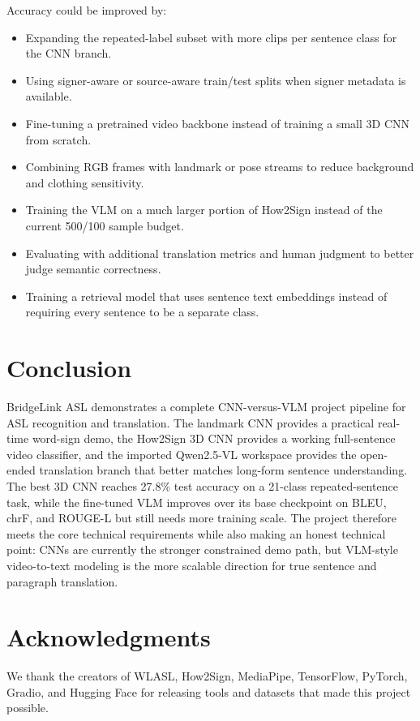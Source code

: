 \documentclass[10pt,twocolumn,letterpaper]{article}
\begin{document}
Accuracy could be improved by:
\begin{itemize}
    \item Expanding the repeated-label subset with more clips per sentence class for the CNN branch.
    \item Using signer-aware or source-aware train/test splits when signer metadata is available.
    \item Fine-tuning a pretrained video backbone instead of training a small 3D CNN from scratch.
    \item Combining RGB frames with landmark or pose streams to reduce background and clothing sensitivity.
    \item Training the VLM on a much larger portion of How2Sign instead of the current 500/100 sample budget.
    \item Evaluating with additional translation metrics and human judgment to better judge semantic correctness.
    \item Training a retrieval model that uses sentence text embeddings instead of requiring every sentence to be a separate class.
\end{itemize}

\section{Conclusion}

BridgeLink ASL demonstrates a complete CNN-versus-VLM project pipeline for ASL recognition and translation. The landmark CNN provides a practical real-time word-sign demo, the How2Sign 3D CNN provides a working full-sentence video classifier, and the imported Qwen2.5-VL workspace provides the open-ended translation branch that better matches long-form sentence understanding. The best 3D CNN reaches 27.8\% test accuracy on a 21-class repeated-sentence task, while the fine-tuned VLM improves over its base checkpoint on BLEU, chrF, and ROUGE-L but still needs more training scale. The project therefore meets the core technical requirements while also making an honest technical point: CNNs are currently the stronger constrained demo path, but VLM-style video-to-text modeling is the more scalable direction for true sentence and paragraph translation.

\section*{Acknowledgments}

We thank the creators of WLASL, How2Sign, MediaPipe, TensorFlow, PyTorch, Gradio, and Hugging Face for releasing tools and datasets that made this project possible.

{\small


}
\end{document}
